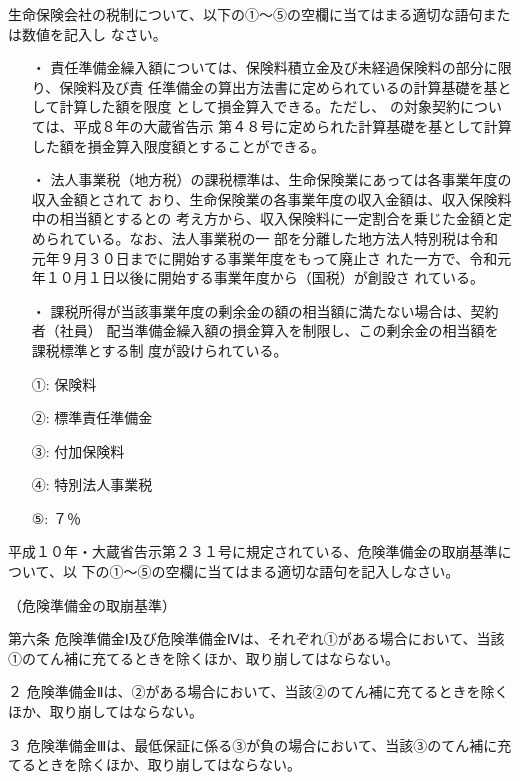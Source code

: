 \documentclass[report,gutter=10mm,fore-edge=10mm,uplatex,dvipdfmx]{jlreq}
\begin{document}
生命保険会社の税制について、以下の①～⑤の空欄に当てはまる適切な語句または数値を記入し
なさい。

\begin{itemize}
\item[・] 責任準備金繰入額については、保険料積立金及び未経過保険料の部分に限り、保険料及び責
任準備金の算出方法書に定められているの計算基礎を基として計算した額を限度
として損金算入できる。ただし、
の対象契約については、平成８年の大蔵省告示
第４８号に定められた計算基礎を基として計算した額を損金算入限度額とすることができる。
\item[・] 法人事業税（地方税）の課税標準は、生命保険業にあっては各事業年度の収入金額とされて
おり、生命保険業の各事業年度の収入金額は、収入保険料中の相当額とするとの
考え方から、収入保険料に一定割合を乗じた金額と定められている。なお、法人事業税の一
部を分離した地方法人特別税は令和元年９月３０日までに開始する事業年度をもって廃止さ
れた一方で、令和元年１０月１日以後に開始する事業年度から（国税）が創設さ
れている。
\item[・] 課税所得が当該事業年度の剰余金の額の相当額に満たない場合は、契約者（社員）
配当準備金繰入額の損金算入を制限し、この剰余金の相当額を課税標準とする制
度が設けられている。
\end{itemize}
\answer{}
\begin{itemize}
\item[ ①: ] 保険料
\item[ ②: ] 標準責任準備金
\item[ ③: ] 付加保険料
\item[ ④: ] 特別法人事業税
\item[ ⑤: ] ７％
\end{itemize}



平成１０年・大蔵省告示第２３１号に規定されている、危険準備金の取崩基準について、以
下の①～⑤の空欄に当てはまる適切な語句を記入しなさい。

（危険準備金の取崩基準）

第六条 危険準備金Ⅰ及び危険準備金Ⅳは、それぞれ①がある場合において、当該
①のてん補に充てるときを除くほか、取り崩してはならない。

２ 危険準備金Ⅱは、②がある場合において、当該②のてん補に充てるときを除くほか、取り崩してはならない。

３ 危険準備金Ⅲは、最低保証に係る③が負の場合において、当該③のてん補に充てるときを除くほか、取り崩してはならない。
\end{document}

